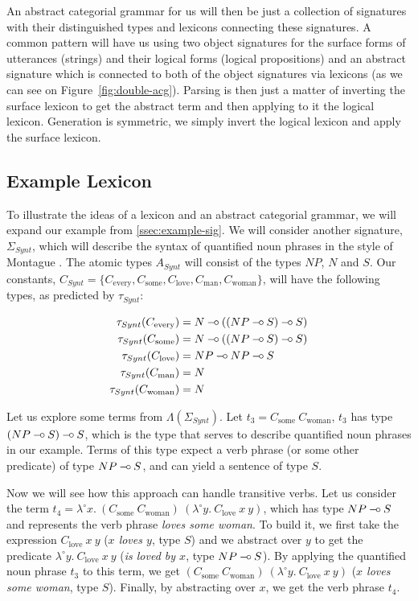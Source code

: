 An abstract categorial grammar for us will then be just a collection of
signatures with their distinguished types and lexicons connecting these
signatures. A common pattern will have us using two object signatures
for the surface forms of utterances (strings) and their logical forms
(logical propositions) and an abstract signature which is connected to
both of the object signatures via lexicons (as we can see on
Figure~\ref{fig:double-acg}). Parsing is then just a matter of inverting
the surface lexicon to get the abstract term and then applying to it the
logical lexicon. Generation is symmetric, we simply invert the logical
lexicon and apply the surface lexicon.

\subsection{Example Lexicon}
\label{ssec:example-lex}

\newcommand{\synt}[1]{C_{\textrm{#1}}}

To illustrate the ideas of a lexicon and an abstract categorial grammar,
we will expand our example from \ref{ssec:example-sig}. We will
consider another signature, $\Sigma_{Synt}$, which will describe the
syntax of quantified noun phrases in the style of Montague
\cite{montague1973proper}. The atomic types $A_{Synt}$ will consist of
the types $NP$, $N$ and $S$. Our constants, $C_{Synt} = \{\synt{every},
\synt{some}, \synt{love}, \synt{man}, \synt{woman}\}$, will have the
following types, as predicted by $\tau_{Synt}$:

\begin{align*}
\tau_{Synt}(\synt{every}) &= N \limp ((NP \limp S) \limp S) \\
\tau_{Synt}(\synt{some}) &= N \limp ((NP \limp S) \limp S) \\
\tau_{Synt}(\synt{love}) &= NP \limp NP \limp S \\
\tau_{Synt}(\synt{man}) &= N \\
\tau_{Synt}(\synt{woman}) &= N
\end{align*}

Let us explore some terms from $\Lambda(\Sigma_{Synt})$. Let $t_3 =
\synt{some}\ \synt{woman}$, $t_3$ has type $(NP \mathbin{{-}\mkern-3.5mu{\circ}} S) \mathbin{{-}\mkern-3.5mu{\circ}} S$, which
is the type that serves to describe quantified noun phrases in our
example. Terms of this type expect a verb phrase (or some other
predicate) of type $NP \mathbin{{-}\mkern-3.5mu{\circ}} S$, and can yield a sentence of type $S$.

Now we will see how this approach can handle transitive verbs. Let us
consider the term $t_4 = \lambda^{\circ}
x.\ (\synt{some}\ \synt{woman})\ (\lambda^{\circ}
y.\ \synt{love}\ x\ y)$, which has type $NP \mathbin{{-}\mkern-3.5mu{\circ}} S$ and represents the
verb phrase \emph{loves some woman}. To build it, we first take the
expression $\synt{love}\ x\ y$ (\emph{$x$ loves $y$}, type $S$) and we
abstract over $y$ to get the predicate $\lambda^{\circ}
y.\ \synt{love}\ x\ y$ (\emph{is loved by $x$}, type $NP \mathbin{{-}\mkern-3.5mu{\circ}} S$). By
applying the quantified noun phrase $t_3$ to this term, we get
$(\synt{some}\ \synt{woman})\ (\lambda^{\circ} y.\ \synt{love}\ x\ y)$
(\emph{$x$ loves some woman}, type $S$). Finally, by abstracting over
$x$, we get the verb phrase $t_4$.

